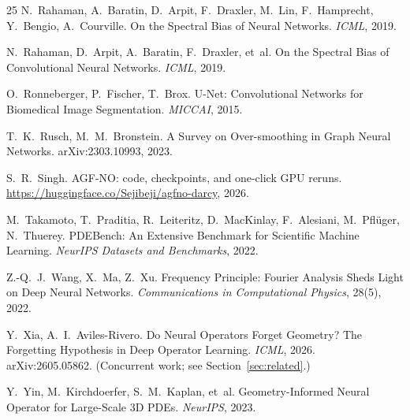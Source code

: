\documentclass[11pt]{article}
\theoremstyle{definition}
\begin{document}
\begin{thebibliography}{25}
N.~Rahaman, A.~Baratin, D.~Arpit, F.~Draxler, M.~Lin, F.~Hamprecht,
Y.~Bengio, A.~Courville.
\newblock On the Spectral Bias of Neural Networks.
\newblock \emph{ICML}, 2019.

N.~Rahaman, D.~Arpit, A.~Baratin, F.~Draxler, et~al.
\newblock On the Spectral Bias of Convolutional Neural Networks.
\newblock \emph{ICML}, 2019.

O.~Ronneberger, P.~Fischer, T.~Brox.
\newblock U-Net: Convolutional Networks for Biomedical Image Segmentation.
\newblock \emph{MICCAI}, 2015.

T.~K.~Rusch, M.~M.~Bronstein.
\newblock A Survey on Over-smoothing in Graph Neural Networks.
\newblock arXiv:2303.10993, 2023.

S.~R.~Singh.
\newblock AGF-NO: code, checkpoints, and one-click GPU reruns.
\newblock \url{https://huggingface.co/Sejibeji/agfno-darcy}, 2026.

M.~Takamoto, T.~Praditia, R.~Leiteritz, D.~MacKinlay, F.~Alesiani,
M.~Pfl{\"u}ger, N.~Thuerey.
\newblock PDEBench: An Extensive Benchmark for Scientific Machine Learning.
\newblock \emph{NeurIPS Datasets and Benchmarks}, 2022.

Z.-Q.~J.~Wang, X.~Ma, Z.~Xu.
\newblock Frequency Principle: Fourier Analysis Sheds Light on Deep Neural
Networks.
\newblock \emph{Communications in Computational Physics}, 28(5), 2022.

Y.~Xia, A.~I.~Aviles-Rivero.
\newblock Do Neural Operators Forget Geometry? The Forgetting Hypothesis in
Deep Operator Learning.
\newblock \emph{ICML}, 2026. arXiv:2605.05862. (Concurrent work; see
Section~\ref{sec:related}.)

Y.~Yin, M.~Kirchdoerfer, S.~M.~Kaplan, et~al.
\newblock Geometry-Informed Neural Operator for Large-Scale 3D PDEs.
\newblock \emph{NeurIPS}, 2023.

\end{thebibliography}
\end{document}
